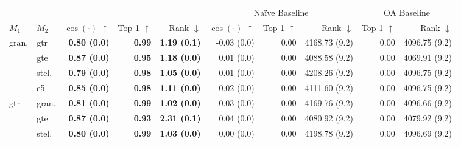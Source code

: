


\begin{table}[!b]
    \scriptsize
    \centering
    \begin{tabular}{llrrrrrrrr}
        \toprule
        \multicolumn{2}{c}{} & \multicolumn{3}{c}{\atk{}} & \multicolumn{3}{c}{Naïve Baseline} & \multicolumn{2}{c}{OA Baseline}\\
        \cmidrule(lr){3-5} \cmidrule(lr){6-8}  \cmidrule(lr){9-10} 
        $M_1$ & $M_2$ & $\cos(\cdot)$ $\uparrow$ & Top-1 $\uparrow$ & Rank $\downarrow$ & $\cos(\cdot)$ $\uparrow$ & Top-1 $\uparrow$ & Rank $\downarrow$ & Top-1 $\uparrow$ & Rank $\downarrow$\\
        \midrule
        \multirow{4}{*}{gran.} & gtr & \textbf{0.80 {\tiny (0.0)}} & \textbf{0.99} & \textbf{1.19 {\tiny (0.1)}} & -0.03 {\tiny (0.0)} & 0.00 & 4168.73 {\tiny (9.2)} & 0.00 & 4096.75 {\tiny (9.2)} \\
         & gte & \textbf{0.87 {\tiny (0.0)}} & \textbf{0.95} & \textbf{1.18 {\tiny (0.0)}} & 0.01 {\tiny (0.0)} & 0.00 & 4088.58 {\tiny (9.2)} & 0.00 & 4069.91 {\tiny (9.2)} \\
         & stel. & \textbf{0.79 {\tiny (0.0)}} & \textbf{0.98} & \textbf{1.05 {\tiny (0.0)}} & 0.01 {\tiny (0.0)} & 0.00 & 4208.26 {\tiny (9.2)} & 0.00 & 4096.75 {\tiny (9.2)} \\
         & e5 & \textbf{0.85 {\tiny (0.0)}} & \textbf{0.98} & \textbf{1.11 {\tiny (0.0)}} & 0.02 {\tiny (0.0)} & 0.00 & 4111.60 {\tiny (9.2)} & 0.00 & 4096.75 {\tiny (9.2)} \\
        \midrule
        \multirow{4}{*}{gtr} & gran. & \textbf{0.81 {\tiny (0.0)}} & \textbf{0.99} & \textbf{1.02 {\tiny (0.0)}} & -0.03 {\tiny (0.0)} & 0.00 & 4169.76 {\tiny (9.2)} & 0.00 & 4096.66 {\tiny (9.2)} \\
         & gte & \textbf{0.87 {\tiny (0.0)}} & \textbf{0.93} & \textbf{2.31 {\tiny (0.1)}} & 0.04 {\tiny (0.0)} & 0.00 & 4080.92 {\tiny (9.2)} & 0.00 & 4079.92 {\tiny (9.2)} \\
         & stel. & \textbf{0.80 {\tiny (0.0)}} & \textbf{0.99} & \textbf{1.03 {\tiny (0.0)}} & 0.00 {\tiny (0.0)} & 0.00 & 4198.78 {\tiny (9.2)} & 0.00 & 4096.69 {\tiny (9.2)} \\

\end{tabular}
\end{table}

